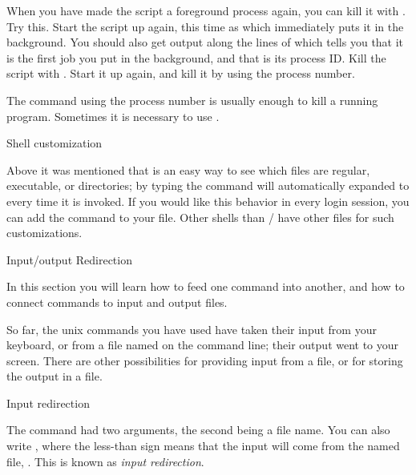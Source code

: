 \begin{exercise}
  When you have made the  script a foreground
    process again, you can kill it with . Try this. Start
    the script up again, this time as  which immediately
    puts it in the background. You should also get output along the
    lines of  which tells you that it is the first job you
    put in the background, and that  is its process ID. Kill
    the script with . Start it up again, and kill it by
    using the process number.
\end{exercise}
\begin{outcome}
  The command  using the process number is usually
  enough to kill a running program. Sometimes it is necessary to use
  .
\end{outcome}

 {Shell customization}

Above it was mentioned that  is an easy way to see which
files are regular, executable, or directories; by typing  the  command will automatically expanded to  every time it is invoked. If you would like this behavior in
every login session, you can add the  command to your
 file. Other shells than / have other files for such
customizations.

 {Input/output Redirection}
\label{sec:unixpipe}

\begin{purpose}
  In this section you will learn how to feed one command into another,
  and how to connect commands to input and output files.
\end{purpose}

So far, the unix commands you have used have taken their input from
your keyboard, or from a file named on the command line; their output
went to your screen. There are other possibilities for providing input
from a file, or for storing the output in a file.

 {Input redirection}

The  command had two arguments, the second being a file
name. You can also write , where the
less-than sign means that the input will come from the named file,
. This is known as \emph{input redirection}.

